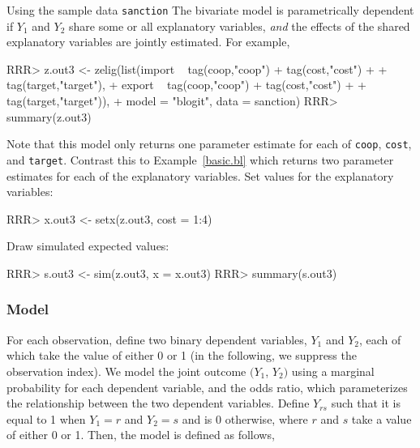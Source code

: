 \begin{enumerate}
Using the sample data \texttt{sanction}
The bivariate model is parametrically dependent if $Y_1$ and $Y_2$ share
some or all explanatory variables, {\it and} the effects of the shared
explanatory variables are jointly estimated.  For example,
\begin{Schunk}
\begin{Sinput}
RRR>  z.out3 <- zelig(list(import ~ tag(coop,"coop") + tag(cost,"cost") + 
+                            tag(target,"target"), 
+                        export ~ tag(coop,"coop") + tag(cost,"cost") + 
+                            tag(target,"target")), 
+                        model = "blogit", data = sanction)
RRR>  summary(z.out3)
\end{Sinput}
\end{Schunk}
Note that this model only returns one parameter estimate for each of
{\tt coop}, {\tt cost}, and {\tt target}.  Contrast this to
Example~\ref{basic.bl} which returns two parameter estimates for each
of the explanatory variables.  \newline \newline Set values for the
explanatory variables:
\begin{Schunk}
\begin{Sinput}
RRR> x.out3 <- setx(z.out3, cost = 1:4)
\end{Sinput}
\end{Schunk}
Draw simulated expected values:  
\begin{Schunk}
\begin{Sinput}
RRR>  s.out3 <- sim(z.out3, x = x.out3)
RRR>  summary(s.out3)
\end{Sinput}
\end{Schunk}


\end{enumerate}

\subsubsection{Model}

For each observation, define two binary dependent variables, $Y_1$ and
$Y_2$, each of which take the value of either 0 or 1 (in the
following, we suppress the observation index).  We model the joint
outcome $(Y_1$, $Y_2)$ using a marginal probability for each dependent
variable, and the odds ratio, which parameterizes the relationship
between the two dependent variables. Define $Y_{rs}$ such that it is
equal to 1 when $Y_1=r$ and $Y_2=s$ and is 0 otherwise, where $r$ and
$s$ take a value of either 0 or 1. Then, the model is defined as follows,

